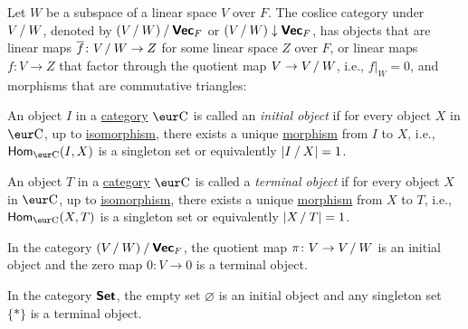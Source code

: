 \begin{example}
  Let $W$ be a subspace of a linear space $V$ over $F$. The coslice category under $V \mathbin{/} W$, denoted by $(V \mathbin{/} W) \mathbin{/} \operatorname{\text{\normalfont\bf\sffamily Vec}}_F$ or $(V \mathbin{/} W) \downarrow \operatorname{\text{\normalfont\bf\sffamily Vec}}_F$, has objects that are linear maps $\overline{f} \colon V \mathbin{/} W \to Z$ for some linear space $Z$ over $F$, or linear maps $f \colon V \to Z$ that factor through the quotient map $V \to V \mathbin{/} W$, i.e., $f|_{W} = 0$, and morphisms that are commutative triangles:
  \begin{center}
  \end{center}
\end{example}

\begin{definition}\label{def:initial_object}
  An object $I$ in a \hyperref[def:category]{category} $\Ca$ is called an \emph{initial object} if for every object $X$ in $\Ca$, up to \hyperref[def:isomorphism]{isomorphism}, there exists a unique \hyperref[def:morphism]{morphism} from $I$ to $X$, i.e., $\Hom_{\Ca}(I, X)$ is a singleton set or equivalently $|I \mathbin{/} X| = 1$.
\end{definition}

\begin{definition}\label{def:terminal_object}
  An object $T$ in a \hyperref[def:category]{category} $\Ca$ is called a \emph{terminal object} if for every object $X$ in $\Ca$, up to \hyperref[def:isomorphism]{isomorphism}, there exists a unique \hyperref[def:morphism]{morphism} from $X$ to $T$, i.e., $\Hom_{\Ca}(X, T)$ is a singleton set or equivalently $|X \mathbin{/} T| = 1$.
\end{definition}

\begin{example}
  In the category $(V \mathbin{/} W) \mathbin{/} \operatorname{\text{\normalfont\bf\sffamily Vec}}_F$, the quotient map $\pi \colon V \to V \mathbin{/} W$ is an initial object and the zero map $0 \colon V \to 0$ is a terminal object.
\end{example}

\begin{example}
  In the category $\operatorname{\text{\normalfont\bf\sffamily Set}}$, the empty set $\varnothing$ is an initial object and any singleton set $\{*\}$ is a terminal object.
\end{example}

